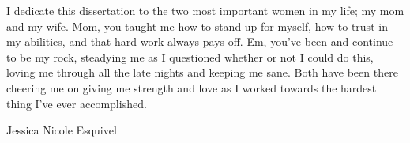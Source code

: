 
\begin{declaration}
  I dedicate this dissertation to the two most important women in my life; my mom and my wife. Mom, you taught me how to stand up for myself, how to trust in my abilities, and that hard work always pays off. Em, you've been and continue to be my rock, steadying me as I questioned whether or not I could do this, loving me through all the late nights and keeping me sane. Both have been there cheering me on giving me strength and love as I worked towards the hardest thing I've ever accomplished.  

  \vspace*{1cm}
  \begin{flushright}
    Jessica Nicole Esquivel 
  \end{flushright}
\end{declaration}



